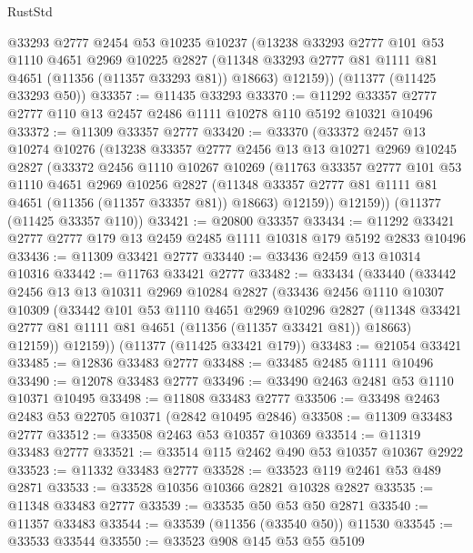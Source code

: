 \begin{lexlean}{RustStd}
\begin{coremodule}
      @33293
      @2777
      @2454
      @53
      @10235
      @10237
      (@13238
        @33293
        @2777
        @101
        @53
        @1110
        @4651
        @2969
        @10225
        @2827
        (@11348 @33293 @2777 @81 @1111 @81 @4651 (@11356 (@11357 @33293 @81)) @18663)
        @12159))
    (@11377 (@11425 @33293 @50))
@33357 := @11435 @33293
@33370 := @11292 @33357 @2777 @2777 @110 @13 @2457 @2486 @1111 @10278 @110 @5192 @10321 @10496
@33372 := @11309 @33357 @2777
@33420 := @33370
    (@33372
      @2457
      @13
      @10274
      @10276
      (@13238
        @33357
        @2777
        @2456
        @13
        @13
        @10271
        @2969
        @10245
        @2827
        (@33372
          @2456
          @1110
          @10267
          @10269
          (@11763
            @33357
            @2777
            @101
            @53
            @1110
            @4651
            @2969
            @10256
            @2827
            (@11348 @33357 @2777 @81 @1111 @81 @4651 (@11356 (@11357 @33357 @81)) @18663)
            @12159))
        @12159))
    (@11377 (@11425 @33357 @110))
@33421 := @20800 @33357
@33434 := @11292 @33421 @2777 @2777 @179 @13 @2459 @2485 @1111 @10318 @179 @5192 @2833 @10496
@33436 := @11309 @33421 @2777
@33440 := @33436 @2459 @13 @10314 @10316
@33442 := @11763 @33421 @2777
@33482 := @33434
    (@33440
      (@33442
        @2456
        @13
        @13
        @10311
        @2969
        @10284
        @2827
        (@33436
          @2456
          @1110
          @10307
          @10309
          (@33442
            @101
            @53
            @1110
            @4651
            @2969
            @10296
            @2827
            (@11348 @33421 @2777 @81 @1111 @81 @4651 (@11356 (@11357 @33421 @81)) @18663)
            @12159))
        @12159))
    (@11377 (@11425 @33421 @179))
@33483 := @21054 @33421
@33485 := @12836 @33483 @2777
@33488 := @33485 @2485 @1111 @10496
@33490 := @12078 @33483 @2777
@33496 := @33490 @2463 @2481 @53 @1110 @10371 @10495
@33498 := @11808 @33483 @2777
@33506 := @33498 @2463 @2483 @53 @22705 @10371 (@2842 @10495 @2846)
@33508 := @11309 @33483 @2777
@33512 := @33508 @2463 @53 @10357 @10369
@33514 := @11319 @33483 @2777
@33521 := @33514 @115 @2462 @490 @53 @10357 @10367 @2922
@33523 := @11332 @33483 @2777
@33528 := @33523 @119 @2461 @53 @489 @2871
@33533 := @33528 @10356 @10366 @2821 @10328 @2827
@33535 := @11348 @33483 @2777
@33539 := @33535 @50 @53 @50 @2871
@33540 := @11357 @33483
@33544 := @33539 (@11356 (@33540 @50)) @11530
@33545 := @33533 @33544
@33550 := @33523 @908 @145 @53 @55 @5109

\end{coremodule}
\end{lexlean}

